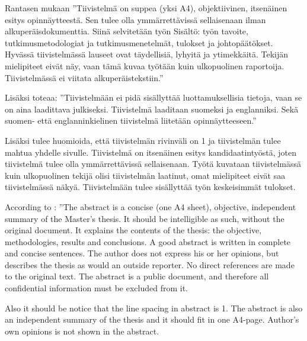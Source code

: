 \documentclass{LUT_pohja}[2016/03/09 LUT Dippa Pohja]
\author{Teemu Teekkari}
\begin{document}
\sloppy
\makecover
%
\newpage
{}

\begin{tiivis}%
Rantasen \citeyearpar[s. 5]{Rantanen14} mukaan ”Tiivistelmä on suppea (yksi A4), objektiivinen, itsenäinen 
esitys  opinnäytteestä.  Sen  tulee  olla  ymmärrettävissä  sellaisenaan  ilman 
alkuperäisdokumenttia. Siinä selvitetään työn Sisältö: työn tavoite, tutkimusmetodologiat 
ja tutkimusmenetelmät, tulokset ja  johtopäätökset. Hyvässä tiivistelmässä lauseet  ovat 
täydellisiä, lyhyitä ja ytimekkäitä. Tekijän mielipiteet eivät näy, vaan tämä kuvaa työtään 
kuin ulkopuolinen raportoija. Tiivistelmässä ei viitata alkuperäistekstiin.”  

Lisäksi \citet[s. 6]{Rantanen14} toteaa: ”Tiivistelmään ei pidä sisällyttää luottamuksellisia 
tietoja, vaan se on aina laadittava julkiseksi. Tiivistelmä laaditaan suomeksi ja englanniksi. 
Sekä suomen- että englanninkielinen tiivistelmä liitetään opinnäytteeseen.”  

Lisäksi tulee huomioida, että tiivistelmän rivinväli on 1 ja tiivistelmän tulee mahtua 
yhdelle sivulle. Tiivistelmä on itsenäinen esitys kandidaatintyöstä, joten tiivistelmä tulee 
olla ymmärrettävissä sellaisenaan. Työtä kuvataan tiivistelmässä kuin ulkopuolinen tekijä 
olisi tiivistelmän laatinut, omat  mielipiteet eivät saa tiivistelmässä näkyä. Tiivistelmään 
tulee sisällyttää työn keskeisimmät tulokset. \citep{Lut14}

\end{tiivis}


\begin{Abstract}
According to \citet[s. 5]{Rantanen10}: ”The abstract is a concise (one A4 sheet), objective, 
independent summary of the Master’s thesis. It should be intelligible as such, without the 
original document. It explains the contents of the thesis: the objective, methodologies, 
results and conclusions. A good abstract is written in complete and concise sentences. The 
author does not express his or her opinions, but describes the thesis as would an outside 
reporter. No direct references are made to the original text. The abstract is a public 
document, and therefore all confidential information must be excluded from it.\par

Also it should be notice that the line spacing in abstract is 1. The abstract is also an 
independent summary of the thesis and it should fit in one A4-page. Author’s own 
opinions is not shown in the abstract.\citep{Lut14}

\end{Abstract}
\end{document}

